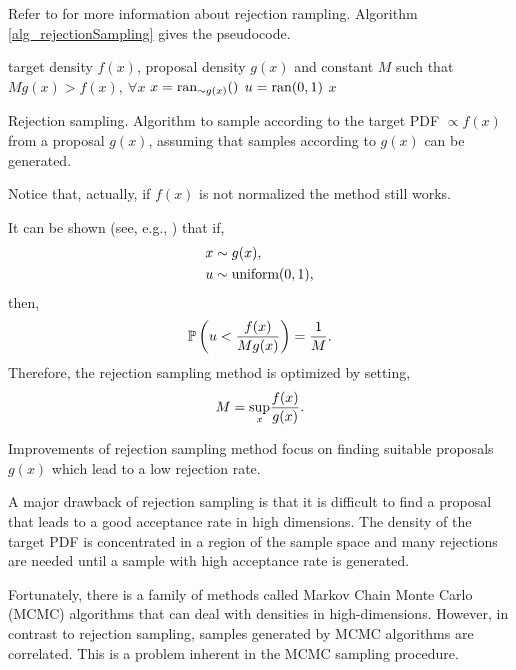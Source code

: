 Refer to \textcite{robert2004} for more information about rejection rampling. Algorithm \ref{alg_rejectionSampling} gives the pseudocode.

\vspace{5mm}
\begin{algorithm}[H]
\SetAlgoLined
   target density $f(x)$, proposal density $g(x)$ and constant $M$ such that $Mg(x) > f(x), \ \forall x$\;
  {
    $x = \textup{ran}_{\sim g(x)}()$\;
    $u = \textup{ran}(0,1)$\;
  }
   $x$\;
\caption[Rejection sampling]
{
  Rejection sampling. Algorithm to sample according to the target PDF $\propto f(x)$ from a proposal $g(x)$, assuming that samples according to $g(x)$ can be generated.
}
\label{alg_rejectionSampling}
\end{algorithm}
\vspace{5mm}

\begin{remark}
  Notice that, actually, if $f(x)$ is not normalized the method still works.
\end{remark}

\begin{remark}
  It can be shown (see, e.g., \cite{robert2004}) that if,
  $$
   \begin{aligned}  
    x &\sim g(x), \\
    u &\sim \textup{uniform}(0,1), \\
   \end{aligned}
  $$
  then,
  $$
    \mathbb{P}\left( u < \frac{f(x)}{Mg(x)} \right) = \frac{1}{M}. \\
  $$
  Therefore, the rejection sampling method is optimized by setting,
  $$
    M = \underset{x}{\textup{sup}} \frac{f(x)}{g(x)}.
  $$
\end{remark}

\begin{remark}
  Improvements of rejection sampling method focus on finding suitable proposals $g(x)$ which lead to a low rejection rate.
\end{remark}

A major drawback of rejection sampling is that it is difficult to find a proposal that leads to a good acceptance rate in high dimensions. The density of the target PDF is concentrated in a region of the sample space and many rejections are needed until a sample with high acceptance rate is generated.

Fortunately, there is a family of methods called Markov Chain Monte Carlo (MCMC) algorithms that can deal with densities in high-dimensions. However, in contrast to rejection sampling, samples generated by MCMC algorithms are correlated. This is a problem inherent in the MCMC sampling procedure.

